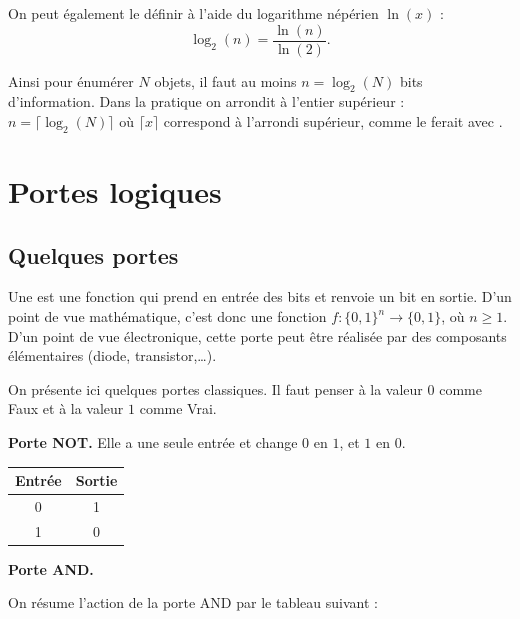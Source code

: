 \documentclass[11pt,class=report,crop=false]{standalone}
\begin{document}
On peut également le définir à l'aide du logarithme népérien $\ln(x)$ :
$$\log_2(n) = \frac{\ln(n)}{\ln(2)}.$$

Ainsi pour énumérer $N$ objets, il faut au moins $n = \log_2(N)$ bits d'information. 
Dans la pratique on arrondit à l'entier supérieur : $n = \lceil \log_2(N) \rceil$ 
où $ \lceil x \rceil$ correspond à l'arrondi supérieur, comme le ferait  avec \Python.




\section{Portes logiques}


\subsection{Quelques portes}

Une  est une fonction qui prend en entrée des bits et renvoie un bit en sortie. 
D'un point de vue mathématique, c'est donc une fonction $f : \{0,1\}^n \to \{0,1\}$, où $n\ge1$.
D'un point de vue électronique, cette porte peut être réalisée par des composants élémentaires (diode, transistor,\ldots).

On présente ici quelques portes classiques. 
Il faut penser à la valeur $0$ comme \og{}Faux\fg{} et à la valeur $1$ comme \og{}Vrai\fg{}.

\textbf{Porte NOT.}
Elle a une seule entrée et change $0$ en $1$, et $1$ en $0$.




\begin{center}
\begin{tabular}{|c|c|}
\hline
Entrée &  Sortie \\ \hline\hline
0 & 1 \\
1 & 0 \\ \hline
\end{tabular}
\end{center}

\textbf{Porte AND.}


On résume l'action de la porte AND par le tableau suivant :
\end{document}
